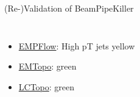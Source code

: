 \begin{frame}{(Re-)Validation of BeamPipeKiller}
\begin{columns}
\begin{column}{0.5\textwidth}
\begin{figure}
            \end{figure}
        \end{column}
    \end{columns}
        \begin{itemize}
        \item \href{https://atlas-computing.web.cern.ch/atlas-computing/links/PhysValDir/JetEtMiss/jet_21-08-04_task1/AntiKt4EMPFlowJets/index.html}{EMPFlow}: High pT jets yellow
        \item \href{https://atlas-computing.web.cern.ch/atlas-computing/links/PhysValDir/JetEtMiss/jet_21-08-04_task1/AntiKt4EMTopoJets/index.html}{EMTopo}: green
        \item \href{https://atlas-computing.web.cern.ch/atlas-computing/links/PhysValDir/JetEtMiss/jet_21-08-04_task1/AntiKt4LCTopoJets/index.html}{LCTopo}: green
    \end{itemize}
\end{frame}